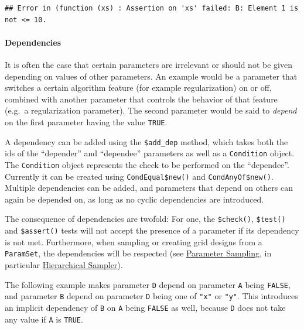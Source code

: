 \documentclass[]{scrbook}
\newenvironment{Shaded}{\begin{snugshade}}{\end{snugshade}}
\newcommand{\KeywordTok}[1]{\textcolor[rgb]{0.13,0.29,0.53}{\textbf{#1}}}
\newcommand{\NormalTok}[1]{#1}
\newcommand{\OperatorTok}[1]{\textcolor[rgb]{0.81,0.36,0.00}{\textbf{#1}}}
\newcommand{\OtherTok}[1]{\textcolor[rgb]{0.56,0.35,0.01}{#1}}
\newcommand{\StringTok}[1]{\textcolor[rgb]{0.31,0.60,0.02}{#1}}
\let\oldparagraph\paragraph
\renewcommand{\paragraph}[1]{\oldparagraph{#1}\mbox{}}
\renewenvironment{Shaded} {\begin{snugshade}\small} {\end{snugshade}}
\begin{document}
\begin{verbatim}
## Error in (function (xs) : Assertion on 'xs' failed: B: Element 1 is not <= 10.
\end{verbatim}

\hypertarget{dependencies}{%
\paragraph{Dependencies}\label{dependencies}}

It is often the case that certain parameters are irrelevant or should not be given depending on values of other parameters.
An example would be a parameter that switches a certain algorithm feature (for example regularization) on or off, combined with another parameter that controls the behavior of that feature (e.g.~a regularization parameter).
The second parameter would be said to \emph{depend} on the first parameter having the value \texttt{TRUE}.

A dependency can be added using the \texttt{\$add\_dep} method, which takes both the ids of the ``depender'' and ``dependee'' parameters as well as a \texttt{Condition} object.
The \texttt{Condition} object represents the check to be performed on the ``dependee''.
Currently it can be created using \texttt{CondEqual\$new()} and \texttt{CondAnyOf\$new()}.
Multiple dependencies can be added, and parameters that depend on others can again be depended on, as long as no cyclic dependencies are introduced.

The consequence of dependencies are twofold:
For one, the \texttt{\$check()}, \texttt{\$test()} and \texttt{\$assert()} tests will not accept the presence of a parameter if its dependency is not met.
Furthermore, when sampling or creating grid designs from a \texttt{ParamSet}, the dependencies will be respected (see \protect\hyperlink{parameter-sampling}{Parameter Sampling}, in particular \protect\hyperlink{hierarchical-sampler}{Hierarchical Sampler}).

The following example makes parameter \texttt{D} depend on parameter \texttt{A} being \texttt{FALSE}, and parameter \texttt{B} depend on parameter \texttt{D} being one of \texttt{"x"} or \texttt{"y"}.
This introduces an implicit dependency of \texttt{B} on \texttt{A} being \texttt{FALSE} as well, because \texttt{D} does not take any value if \texttt{A} is \texttt{TRUE}.

\begin{Shaded}
\end{Shaded}
\end{document}
